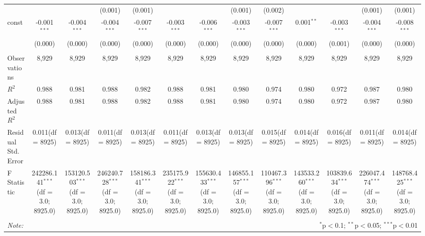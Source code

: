\begin{table}[!htbp]
\begin{tabular}{@{\extracolsep{5pt}}lcccccccccccc}
  & & & (0.001) & (0.001) & & & (0.001) & (0.002) & & & (0.001) & (0.001) \\
 const & -0.001$^{***}$ & -0.004$^{***}$ & -0.004$^{***}$ & -0.007$^{***}$ & -0.003$^{***}$ & -0.006$^{***}$ & -0.003$^{***}$ & -0.007$^{***}$ & 0.001$^{**}$ & -0.003$^{***}$ & -0.004$^{***}$ & -0.008$^{***}$ \\
  & (0.000) & (0.000) & (0.000) & (0.000) & (0.000) & (0.000) & (0.000) & (0.000) & (0.000) & (0.001) & (0.000) & (0.000) \\
\hline \\[-1.8ex]
 Observations & 8,929 & 8,929 & 8,929 & 8,929 & 8,929 & 8,929 & 8,929 & 8,929 & 8,929 & 8,929 & 8,929 & 8,929 \\
 $R^2$ & 0.988 & 0.981 & 0.988 & 0.982 & 0.988 & 0.981 & 0.980 & 0.974 & 0.980 & 0.972 & 0.987 & 0.980 \\
 Adjusted $R^2$ & 0.988 & 0.981 & 0.988 & 0.982 & 0.988 & 0.981 & 0.980 & 0.974 & 0.980 & 0.972 & 0.987 & 0.980 \\
 Residual Std. Error & 0.011(df = 8925) & 0.013(df = 8925) & 0.011(df = 8925) & 0.013(df = 8925) & 0.011(df = 8925) & 0.013(df = 8925) & 0.013(df = 8925) & 0.015(df = 8925) & 0.014(df = 8925) & 0.016(df = 8925) & 0.011(df = 8925) & 0.014(df = 8925)  \\
 F Statistic & 242286.141$^{***}$ (df = 3.0; 8925.0) & 153120.503$^{***}$ (df = 3.0; 8925.0) & 246240.728$^{***}$ (df = 3.0; 8925.0) & 158186.341$^{***}$ (df = 3.0; 8925.0) & 235175.922$^{***}$ (df = 3.0; 8925.0) & 155630.433$^{***}$ (df = 3.0; 8925.0) & 146855.157$^{***}$ (df = 3.0; 8925.0) & 110467.396$^{***}$ (df = 3.0; 8925.0) & 143533.260$^{***}$ (df = 3.0; 8925.0) & 103839.634$^{***}$ (df = 3.0; 8925.0) & 226047.474$^{***}$ (df = 3.0; 8925.0) & 148768.425$^{***}$ (df = 3.0; 8925.0) \\
\hline
\hline \\[-1.8ex]
\textit{Note:} & \multicolumn{12}{r}{$^{*}$p$<$0.1; $^{**}$p$<$0.05; $^{***}$p$<$0.01} \\
\end{tabular}
\end{table}